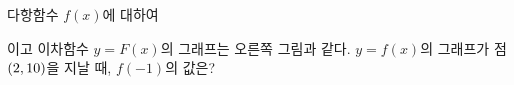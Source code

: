 \noindent\begin{minipage}[t]{0.58\linewidth}\vspace{0pt}\raggedright 다항함수 $f(x)$에 대하여\par\smallskip\end{minipage}\hfill\begin{minipage}[t]{0.4\linewidth}\vspace{0pt}\centering \resizebox{\ifdim\width>\linewidth\linewidth\else\width\fi}{!}{}\end{minipage}\par
\noindent {}\par\smallskip\noindent 이고 이차함수 $y=F(x)$의 그래프는 오른쪽 그림과 같다. $y=f(x)$의 그래프가 점 $(2{,}\mkern3mu\mathopen{}10)$을 지날 때, $f(-1)$의 값은?
